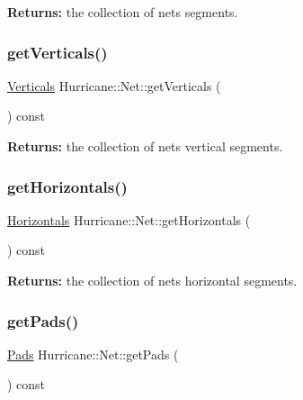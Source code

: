 {\bfseries Returns\+:} the collection of net\textquotesingle{}s segments. \mbox{\label{classHurricane_1_1Net_a97f32cf738af9cf107833ca81fe95db8}} 
\subsubsection{\texorpdfstring{get\+Verticals()}{getVerticals()}}
{\footnotesize\ttfamily \mbox{\hyperlink{namespaceHurricane_a146e2d3d34b4035aff422f12e85345b9}{Verticals}} Hurricane\+::\+Net\+::get\+Verticals (\begin{DoxyParamCaption}{ }\end{DoxyParamCaption}) const}

{\bfseries Returns\+:} the collection of net\textquotesingle{}s vertical segments. \mbox{\label{classHurricane_1_1Net_ad8553af888909e1c127e12e68bd000fb}} 
\subsubsection{\texorpdfstring{get\+Horizontals()}{getHorizontals()}}
{\footnotesize\ttfamily \mbox{\hyperlink{namespaceHurricane_a721e644c7d97f2f66049ab062140b855}{Horizontals}} Hurricane\+::\+Net\+::get\+Horizontals (\begin{DoxyParamCaption}{ }\end{DoxyParamCaption}) const}

{\bfseries Returns\+:} the collection of net\textquotesingle{}s horizontal segments. \mbox{\label{classHurricane_1_1Net_a564df07be5589bc72dd6eb944855aa2b}} 
\subsubsection{\texorpdfstring{get\+Pads()}{getPads()}}
{\footnotesize\ttfamily \mbox{\hyperlink{namespaceHurricane_abd1f433c44d8b515e1b8a8810aea1610}{Pads}} Hurricane\+::\+Net\+::get\+Pads (\begin{DoxyParamCaption}{ }\end{DoxyParamCaption}) const}

